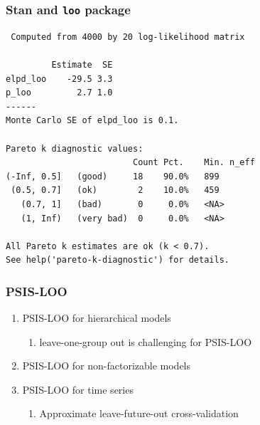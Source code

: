 \documentclass[10pt]{beamer}
\begin{document}
\begin{frame}[fragile]
\frametitle{Stan and {\tt loo} package}

  {\scriptsize
\begin{lstlisting}
 Computed from 4000 by 20 log-likelihood matrix

         Estimate  SE
elpd_loo    -29.5 3.3
p_loo         2.7 1.0
------
Monte Carlo SE of elpd_loo is 0.1.

Pareto k diagnostic values:
                         Count Pct.    Min. n_eff
(-Inf, 0.5]   (good)     18    90.0%   899
 (0.5, 0.7]   (ok)        2    10.0%   459
   (0.7, 1]   (bad)       0     0.0%   <NA>
   (1, Inf)   (very bad)  0     0.0%   <NA>

All Pareto k estimates are ok (k < 0.7).
See help('pareto-k-diagnostic') for details.
\end{lstlisting}
}

\end{frame}

\begin{frame}
\frametitle{PSIS-LOO}

\begin{enumerate}
  \item PSIS-LOO for hierarchical models
  \begin{enumerate}
  \item leave-one-group out is challenging for PSIS-LOO
  \end{enumerate}
  \item<2-> PSIS-LOO for non-factorizable models
  \item<3-> PSIS-LOO for time series
  \begin{enumerate}
  \item Approximate leave-future-out cross-validation %
  \end{enumerate}
\end{enumerate}

\end{frame}
\end{document}
